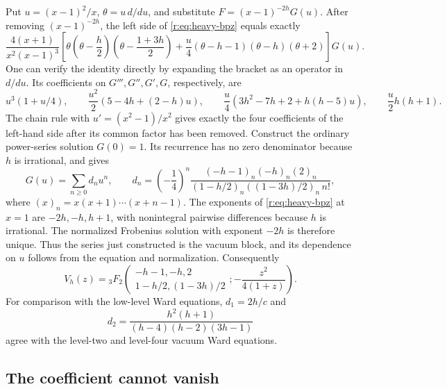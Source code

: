 \documentclass[11pt,a4paper]{article}
\numberwithin{equation}{section}
\theoremstyle{definition}\newtheorem{definition}[theorem]{Definition}
\theoremstyle{remark}\newtheorem{remark}[theorem]{Remark}
\begin{document}
Put $u=(x-1)^2/x$, $\theta=u\,d/du$, and substitute
$F=(x-1)^{-2h}G(u)$.  After removing $(x-1)^{-2h}$, the left side of
\eqref{r:eq:heavy-bpz} equals exactly
\begin{equation}
 \frac{4(x+1)}{x^2(x-1)^3}
 \left[
 \theta\left(\theta-\frac h2\right)
       \left(\theta-\frac{1+3h}{2}\right)
 +\frac u4(\theta-h-1)(\theta-h)(\theta+2)
 \right]G(u).
 \label{r:eq:heavy-transformed}
\end{equation}
One can verify the identity directly by expanding the bracket as an
operator in $d/du$.  Its coefficients on $G''',G'',G',G$, respectively,
are
\[
 u^3(1+u/4),\qquad
 \frac{u^2}{2}(5-4h+(2-h)u),\qquad
 \frac u4(3h^2-7h+2+h(h-5)u),\qquad
 \frac u2h(h+1).
\]
The chain rule with $u'=(x^2-1)/x^2$ gives exactly the four coefficients
of the left-hand side after its common factor has been removed.
Construct the ordinary power-series solution $G(0)=1$.  Its recurrence
has no zero denominator because $h$ is irrational, and gives
\begin{equation}
 G(u)=\sum_{n\geq0}d_nu^n,\qquad
 d_n=\left(-\frac14\right)^n
 \frac{(-h-1)_n(-h)_n(2)_n}
 {(1-h/2)_n((1-3h)/2)_n\,n!},
 \label{r:eq:heavy-dn}
\end{equation}
where $(x)_n=x(x+1)\cdots(x+n-1)$.  The exponents of \eqref{r:eq:heavy-bpz} at $x=1$ are
$-2h,-h,h+1$, with nonintegral pairwise differences because $h$ is
irrational.  The normalized Frobenius solution with exponent $-2h$
is therefore unique.  Thus the series just constructed is the vacuum
block, and its dependence on $u$ follows from the equation and
normalization.
Consequently
\[
 V_h(z)={}_3F_2\!\left(
 \begin{matrix}-h-1,-h,2\\1-h/2,(1-3h)/2\end{matrix};
 -\frac{z^2}{4(1+z)}\right).
\]
For comparison with the low-level Ward equations, $d_1=2h/c$ and
\[
 d_2=\frac{h^2(h+1)}{(h-4)(h-2)(3h-1)}
\]
agree with the level-two and level-four vacuum Ward equations.


\subsection{The coefficient cannot vanish}
\end{document}

